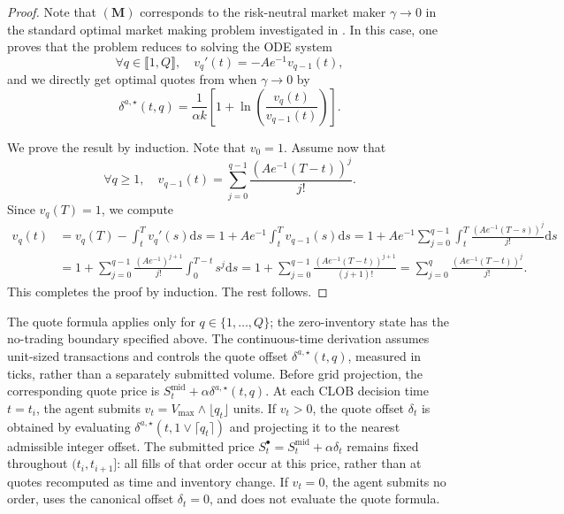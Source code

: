 \documentclass[11pt]{article}
\begin{document}
\begin{proof}
Note that $(\mathbf{M})$ corresponds to the risk-neutral market maker $\gamma\to 0$ in the standard optimal market making problem investigated in \cite{avellaneda2008high,gueant2013dealing}. In this case, one proves that the problem reduces to solving the ODE system 
\[\forall q \in \llbracket 1,Q \rrbracket, \quad v_q'(t) = -Ae^{-1} v_{q-1}(t),\] and we directly get optimal quotes from \cite{gueant2013dealing} when $\gamma\to 0$ by \[\delta^{a,\star}(t,q) = \frac{1}{\alpha k}\left [ 1+\ln \left ( \frac{v_q(t)}{v_{q-1}(t)}\right)\right].\]

    We prove the result by induction. Note that $v_0 = 1$. Assume now that 
    \[\forall q\geqslant 1, \quad v_{q-1}(t)= \sum_{j=0}^{q-1} \frac{(Ae^{-1}(T-t))^j}{j!}.\] 
    Since $v_q(T)=1$, we compute
\begin{align*}
    v_q(t) &= v_q(T)- \int_t^T v_q'(s)\mathrm{d}s =1 + Ae^{-1}\int_t^T v_{q-1}(s)\mathrm{d}s= 1 + Ae^{-1}\sum_{j=0}^{q-1} \int_t^T \frac{(Ae^{-1}(T-s))^j}{j!}\mathrm{d}s\\
    &= 1 + \sum_{j=0}^{q-1} \frac{(Ae^{-1})^{j+1}}{j!}\int_0^{T-t} s^j \mathrm{d}s= 1+\sum_{j=0}^{q-1} \frac{(Ae^{-1}(T-t))^{j+1}}{(j+1)!}= \sum_{j=0}^q \frac{(Ae^{-1}(T-t))^j}{j!}.
\end{align*}
This completes the proof by induction. The rest follows.
\end{proof}

{The quote formula applies only for $q\in\{1,\ldots,Q\}$; the zero-inventory state has the no-trading boundary specified above.} The continuous-time derivation assumes unit-sized transactions and controls the quote offset $\delta^{a,\star}(t,q)$, measured in ticks, rather than a separately submitted volume. Before grid projection, the corresponding quote price is $S_t^{\mathrm{mid}}+\alpha\delta^{a,\star}(t,q)$. At each CLOB decision time $t=t_i$, the agent submits $v_t=V_{\max}\wedge\lfloor q_t\rfloor$ units. If $v_t>0$, the quote offset $\delta_t$ is obtained by evaluating $\delta^{a,\star}(t,1\vee\lceil q_t\rceil)$ and projecting it to the nearest admissible integer offset. The submitted price $S_t^\bullet=S_t^{\mathrm{mid}}+\alpha\delta_t$ remains fixed throughout $(t_i,t_{i+1}]$: all fills of that order occur at this price, rather than at quotes recomputed as time and inventory change. If $v_t=0$, the agent submits no order, uses the canonical offset $\delta_t=0$, and does not evaluate the quote formula.\vspace{0.5em}
\end{document}
